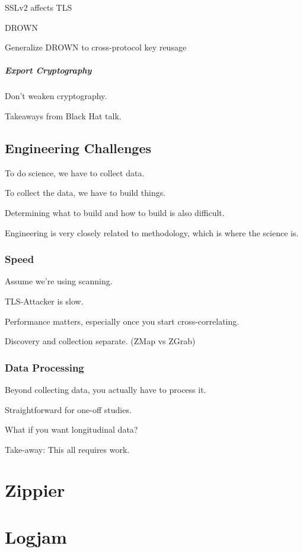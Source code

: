 SSLv2 affects TLS

DROWN

Generalize DROWN to cross-protocol key reusage

\paragraph{Export Cryptography}
Don't weaken cryptography.

Takeaways from Black Hat talk.

\section{Engineering Challenges}

To do science, we have to collect data.

To collect the data, we have to build things.

Determining what to build and how to build is also difficult.

Engineering is very closely related to methodology, which is where the science is.

\subsection{Speed}

Assume we're using scanning.

TLS-Attacker is slow.

Performance matters, especially once you start cross-correlating.

Discovery and collection separate. (ZMap vs ZGrab)

\subsection{Data Processing}

Beyond collecting data, you actually have to process it.

Straightforward for one-off studies.

What if you want longitudinal data?

Take-away: This all requires work.


\chapter{Zippier}

\chapter{Logjam}


